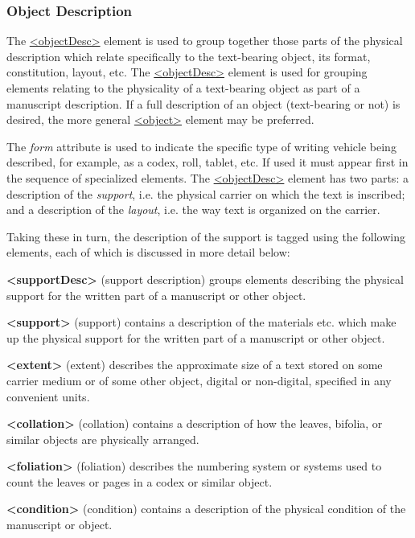 \subsubsection[{Object Description}]{Object Description}\label{msph1}\par
The \hyperref[TEI.objectDesc]{<objectDesc>} element is used to group together those parts of the physical description which relate specifically to the text-bearing object, its format, constitution, layout, etc. The \hyperref[TEI.objectDesc]{<objectDesc>} element is used for grouping elements relating to the physicality of a text-bearing object as part of a manuscript description. If a full description of an object (text-bearing or not) is desired, the more general \hyperref[TEI.object]{<object>} element may be preferred.\par
The {\itshape form} attribute is used to indicate the specific type of writing vehicle being described, for example, as a codex, roll, tablet, etc. If used it must appear first in the sequence of specialized elements. The \hyperref[TEI.objectDesc]{<objectDesc>} element has two parts: a description of the \textit{support}, i.e. the physical carrier on which the text is inscribed; and a description of the \textit{layout}, i.e. the way text is organized on the carrier.\par
Taking these in turn, the description of the support is tagged using the following elements, each of which is discussed in more detail below: 
\begin{sansreflist}
  
\item [\textbf{<supportDesc>}] (support description) groups elements describing the physical support for the written part of a manuscript or other object.
\item [\textbf{<support>}] (support) contains a description of the materials etc. which make up the physical support for the written part of a manuscript or other object.
\item [\textbf{<extent>}] (extent) describes the approximate size of a text stored on some carrier medium or of some other object, digital or non-digital, specified in any convenient units.
\item [\textbf{<collation>}] (collation) contains a description of how the leaves, bifolia, or similar objects are physically arranged.
\item [\textbf{<foliation>}] (foliation) describes the numbering system or systems used to count the leaves or pages in a codex or similar object.
\item [\textbf{<condition>}] (condition) contains a description of the physical condition of the manuscript or object.
\end{sansreflist}
